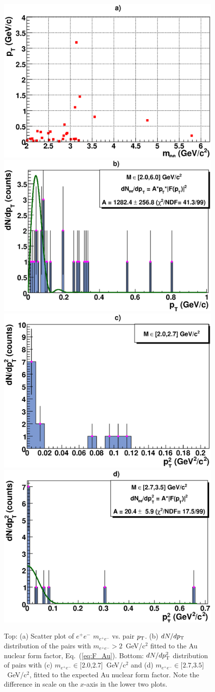 \documentclass[dvipdfm]{elsart}
\begin{document}
\begin{figure}[tbh] 
\begin{center}
\includegraphics[width=0.49\linewidth]{dNdmee_dNdpT_real_unlike_minus_like.eps} 
\includegraphics[width=0.49\linewidth]{dNdpT_real_unlike_minus_like_M20_60_fit_nuclformfactor.eps}
\includegraphics[width=0.49\linewidth]{dNdt_real_unlike_minus_like_M20_27.eps}
\includegraphics[width=0.49\linewidth]{dNdt_real_unlike_minus_like_M27_35_fit_nuclformfactor.eps}
\end{center}
  \caption{
    Top: (a) Scatter plot of $e^+ e^-$ $m_{e^+e^-}$ vs. pair $p_{\rm T}$. (b)
    $dN/dp_{\rm T}$ distribution of the pairs with $m_{e^+e^-}>2$~GeV/c$^2$ fitted to
    the Au nuclear form factor, Eq.~(\ref{eq:F_Au}). 
    Bottom: $dN/d p_{\rm T}^2$ distribution of pairs with (c) $m_{e^+e^-}\in
    \mbox{[2.0,2.7]}$~GeV/c$^2$ and (d) 
    $m_{e^+e^-}\in \mbox{[2.7,3.5]}$~GeV/c$^2$, fitted to
    the expected Au nuclear form factor. Note the difference in scale 
    on the $x$-axis in the lower two plots. 
  }
  \label{fig:minv_ee_pt}
\end{figure}
\end{document}
